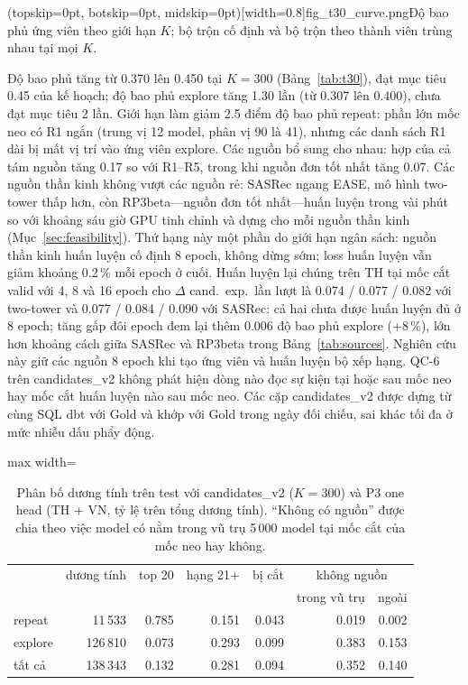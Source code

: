 \documentclass[jtehm]{ieeeaccess}
\makeatletter
\newcommand{\nCandOld}{0.370}        %
\newcommand{\nCandNew}{0.450}        %
\newcommand{\nExpOld}{0.307}         %
\newcommand{\nExpNew}{0.400}         %
\newcommand{\nK}{300}                %
\makeatother
\begin{document}
\Figure[t!](topskip=0pt, botskip=0pt, midskip=0pt)[width=0.8\textwidth]{fig_t30_curve.png}{Độ bao phủ ứng viên theo giới hạn $K$; bộ trộn cố định và bộ trộn theo thành viên trùng nhau tại mọi $K$.\label{fig:curve}}

Độ bao phủ tăng từ \nCandOld{} lên \nCandNew{} tại $K = \nK{}$ (Bảng~\ref{tab:t30}), đạt mục tiêu 0.45 của kế hoạch; độ bao phủ explore tăng 1.30 lần (từ \nExpOld{} lên \nExpNew{}), chưa đạt mục tiêu 2 lần. Giới hạn làm giảm 2.5 điểm độ bao phủ repeat: phần lớn mốc neo có R1 ngắn (trung vị 12 model, phân vị 90 là 41), nhưng các danh sách R1 dài bị mất vị trí vào ứng viên explore. Các nguồn bổ sung cho nhau: hợp của cả tám nguồn tăng 0.17 so với R1--R5, trong khi nguồn đơn tốt nhất tăng 0.07. Các nguồn thần kinh không vượt các nguồn rẻ: SASRec ngang EASE, mô hình two-tower thấp hơn, còn RP3beta—nguồn đơn tốt nhất—huấn luyện trong vài phút so với khoảng sáu giờ GPU tinh chỉnh và dựng cho mỗi nguồn thần kinh (Mục~\ref{sec:feasibility}). Thứ hạng này một phần do giới hạn ngân sách: nguồn thần kinh huấn luyện cố định 8 epoch, không dừng sớm; loss huấn luyện vẫn giảm khoảng 0.2\,\% mỗi epoch ở cuối. Huấn luyện lại chúng trên TH tại mốc cắt valid với 4, 8 và 16 epoch cho $\Delta$ cand.\ exp.\ lần lượt là 0.074 / 0.077 / 0.082 với two-tower và 0.077 / 0.084 / 0.090 với SASRec: cả hai chưa được huấn luyện đủ ở 8 epoch; tăng gấp đôi epoch đem lại thêm 0.006 độ bao phủ explore (+8\,\%), lớn hơn khoảng cách giữa SASRec và RP3beta trong Bảng~\ref{tab:sources}. Nghiên cứu này giữ các nguồn 8 epoch khi tạo ứng viên và huấn luyện bộ xếp hạng. QC-6 trên candidates\_v2 không phát hiện dòng nào đọc sự kiện tại hoặc sau mốc neo hay mốc cắt huấn luyện nào sau mốc neo. Các cặp candidates\_v2 được dựng từ cùng SQL dbt với Gold và khớp với Gold trong ngày đối chiếu, sai khác tối đa ở mức nhiễu dấu phẩy động.

\begin{table}[t]
\caption{Phân bố dương tính trên test với candidates\_v2 ($K = \nK{}$) và P3 one head (TH + VN, tỷ lệ trên tổng dương tính). ``Không có nguồn'' được chia theo việc model có nằm trong vũ trụ 5\,000 model tại mốc cắt của mốc neo hay không.}
\label{tab:t28c}
\setlength{\tabcolsep}{3pt}
\centering
\begin{adjustbox}{max width=\columnwidth}
\begin{tabular}{lrrrrrr}
\toprule
 & dương tính & top 20 & hạng 21+ & bị cắt & \multicolumn{2}{c}{không nguồn} \\
 & & & & & trong vũ trụ & ngoài \\
\midrule
repeat  & 11\,533  & 0.785 & 0.151 & 0.043 & 0.019 & 0.002 \\
explore & 126\,810 & 0.073 & 0.293 & 0.099 & 0.383 & 0.153 \\
tất cả  & 138\,343 & 0.132 & 0.281 & 0.094 & 0.352 & 0.140 \\
\bottomrule
\end{tabular}
\end{adjustbox}
\end{table}
\end{document}
